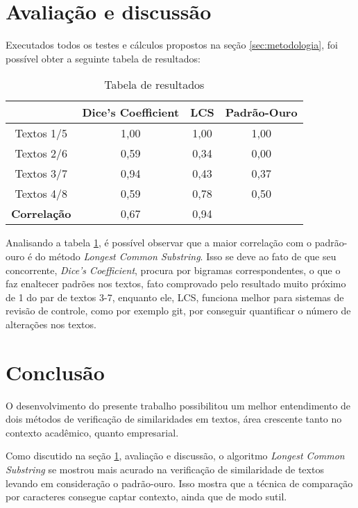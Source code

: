 \documentclass[12pt]{article}
\begin{document}
\section{Avaliação e discussão} \label{sec:avaliacao}

Executados todos os testes e cálculos propostos na seção \ref{sec:metodologia}, foi possível obter a seguinte tabela de resultados:

\begin{table}[H]
\centering
\begin{tabular}{|c|c|c|c}
\hline
 & Dice's Coefficient & LCS & \multicolumn{1}{c|}{Padrão-Ouro} \\ \hline
Textos 1/5 & 1,00 & 1,00 & \multicolumn{1}{c|}{1,00} \\ \hline
Textos 2/6 & 0,59 & 0,34 & \multicolumn{1}{c|}{0,00} \\ \hline
Textos 3/7 & 0,94 & 0,43 & \multicolumn{1}{c|}{0,37} \\ \hline
Textos 4/8 & 0,59 & 0,78 & \multicolumn{1}{c|}{0,50} \\ \hline
\multicolumn{1}{|l|}{\textbf{Correlação}} & 0,67 & 0,94 & \multicolumn{1}{l}{} \\ \cline{1-3}
\end{tabular}
\caption{Tabela de resultados}
\label{tab:resultados}
\end{table}

Analisando a tabela \ref{tab:resultados}, é possível observar que a maior correlação com o padrão-ouro é do método \textit{Longest Common Substring}. Isso se deve ao fato de que seu concorrente, \textit{Dice's Coefficient}, procura por bigramas correspondentes, o que o faz enaltecer padrões nos textos, fato comprovado pelo resultado muito próximo de 1 do par de textos 3-7, enquanto ele, LCS, funciona melhor para sistemas de revisão de controle, como por exemplo git, por conseguir quantificar o número de alterações nos textos.

\section{Conclusão}

O desenvolvimento do presente trabalho possibilitou um melhor entendimento de dois métodos de verificação de similaridades em textos, área crescente tanto no contexto acadêmico, quanto empresarial.

Como discutido na seção \ref{sec:avaliacao}, avaliação e discussão, o algoritmo \textit{Longest Common Substring} se mostrou mais acurado na verificação de similaridade de textos levando em consideração o padrão-ouro. Isso mostra que a técnica de comparação por caracteres consegue captar contexto, ainda que de modo sutil.
\end{document}
